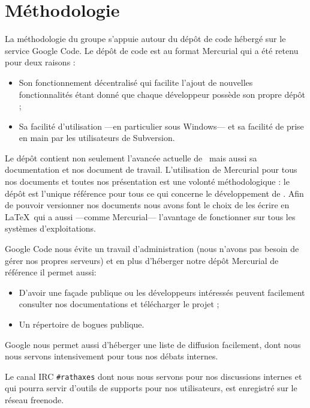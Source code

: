 \documentclass[francais]{rtxreport}
\begin{document}

\section{Méthodologie}

La méthodologie du groupe s'appuie autour du dépôt de code hébergé sur le
service Google Code. Le dépôt de code est au format Mercurial qui a été retenu
pour deux raisons :
\begin{itemize}
\item Son fonctionnement décentralisé qui facilite l'ajout de nouvelles
fonctionnalités étant donné que chaque développeur possède son propre dépôt ;
\item Sa facilité d'utilisation ---en particulier sous Windows--- et sa facilité
de prise en main par les utilisateurs de Subversion.
\end{itemize}

Le dépôt contient non seulement l'avancée actuelle de \rtx\ mais aussi sa
documentation et nos document de travail. L'utilisation de Mercurial pour tous
nos documents et toutes nos présentation est une volonté méthodologique : le
dépôt est l'unique référence pour tous ce qui concerne le développement de \rtx.
Afin de pouvoir versionner nos documents nous avons font le choix de les écrire
en \LaTeX\ qui a aussi ---comme Mercurial--- l'avantage de fonctionner sur tous
les systèmes d'exploitations.

Google Code nous évite un travail d'administration (nous n'avons pas besoin de
gérer nos propres serveurs) et en plus d'héberger notre dépôt Mercurial de
référence il permet aussi:
\begin{itemize}
\item D'avoir une façade publique ou les développeurs intéressés peuvent
facilement consulter nos documentations et télécharger le projet ;
\item Un répertoire de bogues publique.
\end{itemize}
Google nous permet aussi d'héberger une liste de diffusion facilement, dont nous
nous servons intensivement pour tous nos débats internes.

Le canal IRC \texttt{\#rathaxes} dont nous nous servons pour nos discussions
internes et qui pourra servir d'outils de supports pour nos utilisateurs, est
enregistré sur le réseau freenode.
\end{document}
